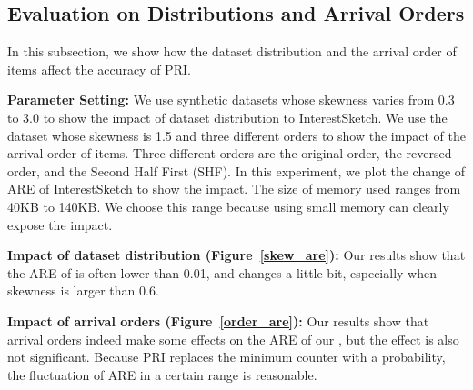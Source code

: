 {\color{reviewA}
\presub
\subsection{Evaluation on Distributions and Arrival Orders} \postsub
\label{eva_data}



In this subsection, we show how the dataset distribution and the arrival order of items affect the accuracy of PRI.

\noindent\textbf{Parameter Setting:}
We use synthetic datasets whose skewness varies from 0.3 to 3.0 to show the impact of dataset distribution to InterestSketch. We use the dataset whose skewness is 1.5 and three different orders to show the impact of the arrival order of items. Three different orders are the original order, the reversed order, and the Second Half First (SHF).
%
In this experiment, we plot the change of ARE of InterestSketch to show the impact.
The size of memory used ranges from 40KB to 140KB. We choose this range because using small memory can clearly expose the impact.

\noindent\textbf{Impact of dataset distribution (Figure~\ref{skew_are}):}
Our results show that the ARE of \sketchname{} is often lower than 0.01, and changes a little bit, especially when skewness is larger than 0.6.

\noindent\textbf{Impact of arrival orders (Figure~\ref{order_are}):}
Our results show that arrival orders indeed make some effects on the ARE of our \sketchname, but the effect is also not significant.
Because PRI replaces the minimum counter with a probability, the fluctuation of ARE in a certain range is reasonable.
}
